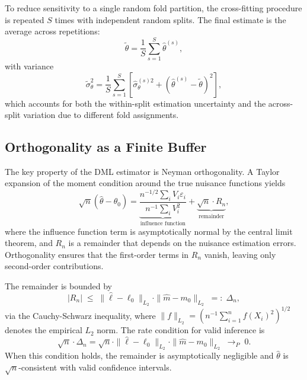 \documentclass[a4paper,10.5pt]{article}
\begin{document}
To reduce sensitivity to a single random fold partition, the cross-fitting procedure is repeated $S$ times with independent random splits. The final estimate is the average across repetitions:
\begin{equation}
    \tilde{\theta} = \frac{1}{S} \sum_{s=1}^{S} \hat{\theta}^{(s)},
\end{equation}
with variance
\begin{equation}
    \tilde{\sigma}^2_\theta = \frac{1}{S} \sum_{s=1}^{S} \left[ \hat{\sigma}^{(s)2}_\theta + \left(\hat{\theta}^{(s)} - \tilde{\theta}\right)^2 \right],
\end{equation}
which accounts for both the within-split estimation uncertainty and the across-split variation due to different fold assignments.


\subsection{Orthogonality as a Finite Buffer}\label{sec:buffer}

The key property of the DML estimator is Neyman orthogonality. A Taylor expansion of the moment condition around the true nuisance functions yields
\begin{equation}\label{eq:expansion}
    \sqrt{n}(\hat{\theta} - \theta_0) = \underbrace{\frac{n^{-1/2} \sum_i V_i \varepsilon_i}{n^{-1} \sum_i V_i^2}}_{\text{influence function}} + \underbrace{\sqrt{n} \cdot R_n}_{\text{remainder}},
\end{equation}
where the influence function term is asymptotically normal by the central limit theorem, and $R_n$ is a remainder that depends on the nuisance estimation errors. Orthogonality ensures that the first-order terms in $R_n$ vanish, leaving only second-order contributions.

The remainder is bounded by
\begin{equation}\label{eq:remainder_bound}
    |R_n| \;\leq\; \|\hat{\ell} - \ell_0\|_{L_2} \cdot \|\hat{m} - m_0\|_{L_2} \;=:\; \Delta_n,
\end{equation}
via the Cauchy-Schwarz inequality, where $\|f\|_{L_2} = \left(n^{-1} \sum_{i=1}^{n} f(X_i)^2\right)^{1/2}$ denotes the empirical $L_2$ norm. The rate condition for valid inference is
\begin{equation}\label{eq:rate_condition}
    \sqrt{n} \cdot \Delta_n = \sqrt{n} \cdot \|\hat{\ell} - \ell_0\|_{L_2} \cdot \|\hat{m} - m_0\|_{L_2} \;\to_P\; 0.
\end{equation}
When this condition holds, the remainder is asymptotically negligible and $\hat{\theta}$ is $\sqrt{n}$-consistent with valid confidence intervals.
\end{document}
